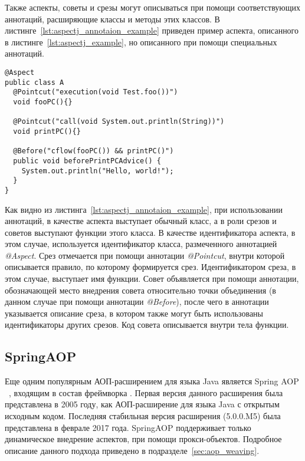 Также аспекты, советы и срезы могут описываться при помощи соответствующих
аннотаций, расширяющие классы и методы этих классов.
В листинге~\ref{lst:aspectj_annotaion_example} приведен пример аспекта,
описанного в листинге~\ref{lst:aspectj_example}, но описанного при помощи
специальных аннотаций.
  \begin{lstlisting}[style={java}, label={lst:aspectj_annotaion_example}, 
  caption={Пример описания аспектов в AspectJ при помощи аннотаций}]
@Aspect
public class A
  @Pointcut("execution(void Test.foo())")
  void fooPC(){}

  @Pointcut("call(void System.out.println(String))")
  void printPC(){}

  @Before("cflow(fooPC()) && printPC()")
  public void beforePrintPCAdvice() {
    System.out.println("Hello, world!");
  }
}
\end{lstlisting}

Как видно из листинга~\ref{lst:aspectj_annotaion_example}, при использовании
аннотаций, в качестве аспекта выступает обычный класс, а в роли срезов и советов
выступают функции этого класса.
В качестве идентификатора аспекта, в этом случае, используется идентификатор
класса, размеченного аннотацией \textit{@Aspect}.
Срез отмечается при помощи аннотации \textit{@Pointcut}, внутри которой
описывается правило, по которому формируется срез.
Идентификатором среза, в этом случае, выступает имя функции.
Совет объявляется при помощи аннотации, обозначающей место внедрения совета
относительно точки объединения (в данном случае при помощи аннотации
\textit{@Before}), после чего в аннотации указывается описание среза, в котором
также могут быть использованы идентификаторы других срезов.
Код совета описывается внутри тела функции.
\subsection{SpringAOP}
\label{sub:spring_aop_overwiev}
Еще одним популярным АОП-расширением для языка Java является Spring AOP
~\cite{spring_aop}, входящим в состав фреймворка .
Первая версия данного расширения была представлена в 2005 году, как
АОП-расширение для языка Java с открытым исходным кодом.
Последняя стабильная версия расширения (5.0.0.M5) была представлена в феврале
2017 года.
SpringAOP поддерживает только динамическое внедрение аспектов, при помощи
прокси-объектов.
Подробное описание данного подхода приведено в подразделе~\ref{sec:aop_weaving}.

